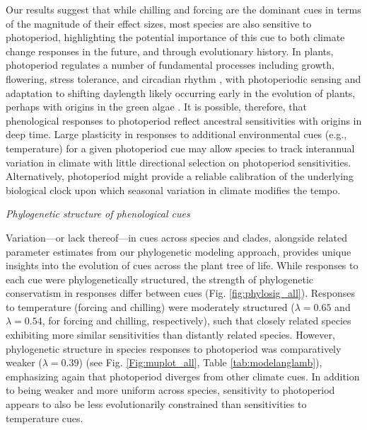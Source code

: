 \documentclass{article}\usepackage[]{graphicx}\usepackage[]{color}
\begin{document}
Our results suggest that while chilling and forcing are the dominant cues in terms of the magnitude of their effect sizes, most species are also sensitive to photoperiod, highlighting the potential importance of this cue to both climate change responses in the future, and through evolutionary history. In plants, photoperiod regulates a number of fundamental processes including growth, flowering, stress tolerance, and circadian rhythm \citep{serrano2017,Singh:2017}, with photoperiodic sensing and adaptation to shifting daylength likely occurring early in the evolution of plants, perhaps with origins in the green algae \citep{serrano2017}. It is possible, therefore, that phenological responses to photoperiod reflect ancestral sensitivities with origins in deep time. Large plasticity in responses to additional environmental cues (e.g., temperature) for a given photoperiod cue \citep[e.g.,][]{kramer1995} may allow species to track interannual variation in climate with little directional selection on photoperiod sensitivities. Alternatively, photoperiod might provide a reliable calibration of the underlying biological clock \citep{jackson2009plant} upon which seasonal variation in climate modifies the tempo. 

\emph{Phylogenetic structure of phenological cues}

Variation---or lack thereof---in cues across species and clades, alongside related parameter estimates from our phylogenetic modeling approach, provides unique insights into the evolution of cues across the plant tree of life. While responses to each cue were phylogenetically structured, the strength of phylogenetic conservatism in responses differ between cues (Fig. \ref{fig:phylosig_all}). Responses to temperature (forcing and chilling) were moderately structured ($\lambda = 0.65$ and $\lambda = 0.54$, for forcing and chilling, respectively), such that closely related species exhibiting more similar sensitivities than distantly related species. However, phylogenetic structure in species responses to photoperiod was comparatively weaker ($\lambda= 0.39$) (see Fig. \ref{Fig:muplot_all}, Table \ref{tab:modelanglamb}), emphasizing again that photoperiod diverges from other climate cues. In addition to being weaker and more uniform across species, sensitivity to photoperiod appears to also be less evolutionarily constrained than sensitivities to temperature cues. %
\end{document}
